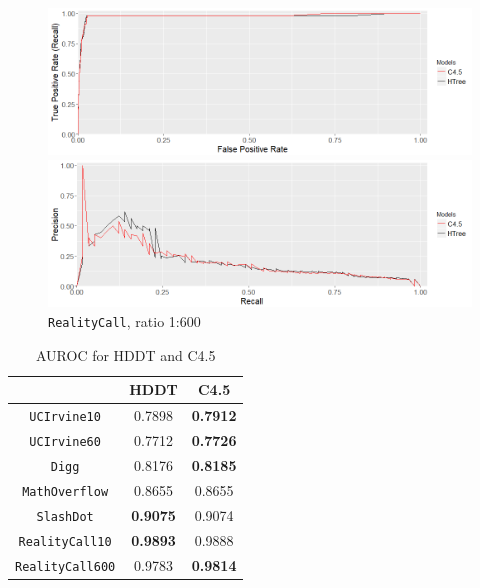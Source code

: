\documentclass{acm_proc_article-sp}
\begin{document}
\begin{figure}
	\begin{multicols}{2}
	\includegraphics[width=\linewidth]{RealityMining_ROC_1_600}\par
	\includegraphics[width=\linewidth]{RealityMining_PR_1_600}\par
\end{multicols}
\caption{\texttt{RealityCall}, ratio 1:600}
\label{RealityCall600}
\end{figure}

\begin{table}
	\centering
	\begin{tabular}{c c c}
		& HDDT & C4.5\\
		\toprule
		\texttt{UCIrvine10} & 0.7898 & \textbf{0.7912}\\
		\texttt{UCIrvine60} & 0.7712 & \textbf{0.7726}\\
		\texttt{Digg} & 0.8176 & \textbf{0.8185}\\
		\texttt{MathOverflow} & 0.8655 & 0.8655\\
		\texttt{SlashDot} & \textbf{0.9075} & 0.9074 \\
		\texttt{RealityCall10} & \textbf{0.9893} & 0.9888\\
		\texttt{RealityCall600} & 0.9783 & \textbf{0.9814}\\
	\end{tabular}
	\caption{AUROC for HDDT and C4.5}
	\label{Table2}
\end{table}
\end{document}
